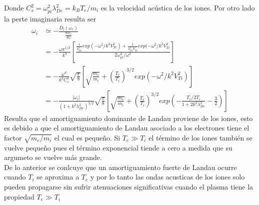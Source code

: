 \documentclass[../tesis_main_file.tex]{subfile}
\begin{document}
Donde $C^2_s=\omega^2_{pi}\lambda^2_{De}=k_BT_e/m_i$ es la velocidad acústica de los iones. Por otro lado la perte imaginaria resulta ser
\begin{equation}
\label{eq:Amortiguamiento_Landau_ondas_iones}
\begin{split}
\omega_i &\simeq -\frac{D_i(\omega_r)}{\frac{dD_r}{d\omega}}\\
&= -\frac{\omega \pi^{1/2}}{k^3}\left[\frac{\frac{1}{\lambda^2_{De}}exp(-\omega^2/k^2V^2_{Te})+\frac{1}{\lambda^2_{Di}V_{Ti}}exp(-\omega^2 /k^2V^2_{Ti}}{2\omega^2_{pi}/\omega^3}\right]\\
&=-\frac{\omega^4}{k^3C^3_s}\sqrt{\frac{\pi}{8}}\left[\sqrt{\frac{m_e}{m_i}}+\left(\frac{T_e}{T_i}\right)^{3/2}exp(-\omega^2/k^2V^2_{Ti})\right]\\
&=-\frac{|\omega_r|}{(1+k^2\lambda^2_{De})^{3/2}}\sqrt{\frac{\pi}{8}}\left[\sqrt{\frac{m_e}{m_i}}+\left(\frac{T_e}{T_i}\right)^{3/2}exp\left(-\frac{T_e/2T_i}{1+2k^2\lambda^2_{De}}-\frac{3}{2}\right)\right]
\end{split}
\end{equation}
Resulta que el amortiguamiento dominante de Landau proviene de los iones, esto es debido a que el amortiguamiento de Landau asociado a los electrones tiene el factor $\sqrt{m_e/m_i}$ el cual es pequeño.
Si $T_e \gg T_i$ el término de los iones también se vuelve pequeño pues el término exponencial tiende a cero a medida que su argumeto se vuelve más grande.\\
De lo anterior se conlcuye que un amortiguamiento fuerte de Landau ocurre cuando $T_i$ se aproxima a $T_e$ y por lo tanto las ondas acusticas de los iones solo pueden propagarse sin sufrir atenuaciones significativas cuando el plasma tiene la propiedad $T_e \gg T_i$
\end{document}
